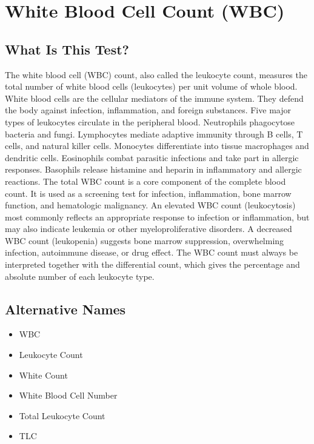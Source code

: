\chapter{White Blood Cell Count (WBC)}

\section*{What Is This Test?}
The white blood cell (WBC) count, also called the leukocyte count, measures the total number of white blood cells (leukocytes) per unit volume of whole blood. White blood cells are the cellular mediators of the immune system. They defend the body against infection, inflammation, and foreign substances. Five major types of leukocytes circulate in the peripheral blood. Neutrophils phagocytose bacteria and fungi. Lymphocytes mediate adaptive immunity through B cells, T cells, and natural killer cells. Monocytes differentiate into tissue macrophages and dendritic cells. Eosinophils combat parasitic infections and take part in allergic responses. Basophils release histamine and heparin in inflammatory and allergic reactions. The total WBC count is a core component of the complete blood count. It is used as a screening test for infection, inflammation, bone marrow function, and hematologic malignancy. An elevated WBC count (leukocytosis) most commonly reflects an appropriate response to infection or inflammation, but may also indicate leukemia or other myeloproliferative disorders. A decreased WBC count (leukopenia) suggests bone marrow suppression, overwhelming infection, autoimmune disease, or drug effect. The WBC count must always be interpreted together with the differential count, which gives the percentage and absolute number of each leukocyte type.

\section*{Alternative Names}
\begin{itemize}
  \item WBC
  \item Leukocyte Count
  \item White Count
  \item White Blood Cell Number
  \item Total Leukocyte Count
  \item TLC
\end{itemize}
